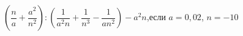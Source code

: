\begin{ex}[type=simplify_calculate]
	\begin{condition}
		\( \left( \dfrac{n}{a}+\dfrac{a^2}{n^2} \right):\left( \dfrac{1}{a^2n}+\dfrac{1}{n^3}-\dfrac{1}{an^2} \right)-a^2n \),\quad если \( a=0,02 \), \( n=-10 \)
	\end{condition}
\end{ex}